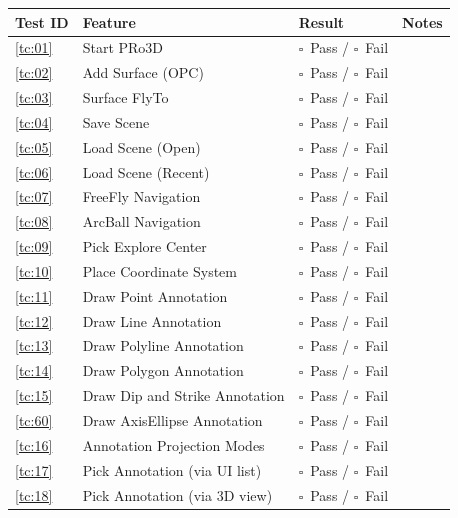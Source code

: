 \documentclass[a4paper,11pt]{article}
\newcommand{\checkbox}{$\square$}
\begin{document}
	\begin{longtable}{p{1.8cm} p{6.5cm} p{2.5cm} p{2.5cm}}
		\toprule
		\textbf{Test ID} & \textbf{Feature} & \textbf{Result} & \textbf{Notes} \\
		\midrule
		\endhead
		\ref{tc:01} & Start PRo3D & \checkbox~Pass / \checkbox~Fail & \\
		\ref{tc:02} & Add Surface (OPC) & \checkbox~Pass / \checkbox~Fail & \\
		\ref{tc:03} & Surface FlyTo & \checkbox~Pass / \checkbox~Fail & \\
		\ref{tc:04} & Save Scene & \checkbox~Pass / \checkbox~Fail & \\
		\ref{tc:05} & Load Scene (Open) & \checkbox~Pass / \checkbox~Fail & \\
		\ref{tc:06} & Load Scene (Recent) & \checkbox~Pass / \checkbox~Fail & \\
		\ref{tc:07} & FreeFly Navigation & \checkbox~Pass / \checkbox~Fail & \\
		\ref{tc:08} & ArcBall Navigation & \checkbox~Pass / \checkbox~Fail & \\
		\ref{tc:09} & Pick Explore Center & \checkbox~Pass / \checkbox~Fail & \\
		\ref{tc:10} & Place Coordinate System & \checkbox~Pass / \checkbox~Fail & \\
		\ref{tc:11} & Draw Point Annotation & \checkbox~Pass / \checkbox~Fail & \\
		\ref{tc:12} & Draw Line Annotation & \checkbox~Pass / \checkbox~Fail & \\
		\ref{tc:13} & Draw Polyline Annotation & \checkbox~Pass / \checkbox~Fail & \\
		\ref{tc:14} & Draw Polygon Annotation & \checkbox~Pass / \checkbox~Fail & \\
		\ref{tc:15} & Draw Dip and Strike Annotation & \checkbox~Pass / \checkbox~Fail & \\
		\ref{tc:60} & Draw AxisEllipse Annotation & \checkbox~Pass / \checkbox~Fail & \\
		\ref{tc:16} & Annotation Projection Modes & \checkbox~Pass / \checkbox~Fail & \\
		\ref{tc:17} & Pick Annotation (via UI list) & \checkbox~Pass / \checkbox~Fail & \\
		\ref{tc:18} & Pick Annotation (via 3D view) & \checkbox~Pass / \checkbox~Fail & \\

\end{longtable}
\end{document}
